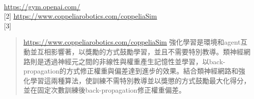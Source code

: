 \begin{flushleft}
{\large {}}\\
\end{flushleft}
\begin{flushleft}\sectionef
[1]\hspace{0.35cm}\href{https://gym.openai.com/}{\underline{https://gym.openai.com/}}\\

[2]\hspace{0.35cm} \href{https://www.coppeliarobotics.com/coppeliaSim}{\underline{https://www.coppeliarobotics.com/coppeliaSim}}\\[5pt]


[3]\hspace{0.35cm}\begin{quote}\vspace{-10pt}
\href{https://www.coppeliarobotics.com/coppeliaSim}{\underline{https://www.coppeliarobotics.com/coppeliaSim}} 強化學習是環境和agent互動並互相影響著，以獎勵的方式鼓勵學習，並且不需要特別教導。類神經網路則是透過神經元之間的非線性與權重產生記憶性並學習，以back-propagation的方式修正權重與偏差達到進步的效果。結合類神經網路和強化學習這兩種算法，使訓練不需特別教導並以獎懲的方式鼓勵最大化得分，並在固定次數訓練後back-propagation修正權重偏差。\\[5pt]
\end{quote}
\iffalse
\parbox[t][5pt][l]{25pt}{[3]}
\begin{minipage}[t]{15pt}
  \underline{https://gym.openai.com/}
\end{minipage}

\makebox[25pt][l]{[3]}\makebox[45pt][l]{\raisebox{-3ex}[5\height]{\underline{https://gym.openai.com/}https://gym.openai.com/https://gym.openai.com/https://gym.openai.com/https://gym.openai.com/https://gym.openai.com/https://gym.openai.com/}}

\makebox[25pt][l]{[3]}\makebox[45pt][l]{\raisebox{-3ex}[5\height]{\underline{https://gym.openai.com/}}}
\fi
\end{flushleft}
